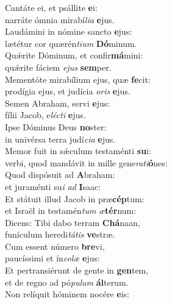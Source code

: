 \evenverse Cantáte ei, et psállite \textbf{e}i:~\*\\
\evenverse narráte ómnia mirabí\textit{li}\textit{a} \textbf{e}jus.\\
\oddverse Laudámini in nómine sancto \textbf{e}jus:~\*\\
\oddverse lætétur cor quærén\textit{ti}\textit{um} \textbf{Dó}minum.\\
\evenverse Quǽrite Dóminum, et confir\textbf{má}mini:~\*\\
\evenverse quǽrite fáciem \textit{e}\textit{jus} \textbf{sem}per.\\
\oddverse Mementóte mirabílium ejus, quæ \textbf{fe}cit:~\*\\
\oddverse prodígia ejus, et judícia \textit{o}\textit{ris} \textbf{e}jus.\\
\evenverse Semen Abraham, servi \textbf{e}jus:~\*\\
\evenverse fílii Jacob, e\textit{lé}\textit{cti} \textbf{e}jus.\\
\oddverse Ipse Dóminus Deus \textbf{no}ster:~\*\\
\oddverse in univérsa terra judí\textit{ci}\textit{a} \textbf{e}jus.\\
\evenverse Memor fuit in sǽculum testaménti \textbf{su}i:~\*\\
\evenverse verbi, quod mandávit in mille gene\textit{ra}\textit{ti}\textbf{ó}nes:\\
\oddverse Quod dispósuit ad \textbf{A}braham:~\*\\
\oddverse et juraménti su\textit{i} \textit{ad} \textbf{I}saac:\\
\evenverse Et státuit illud Jacob in præ\textbf{cép}tum:~\*\\
\evenverse et Israël in testamén\textit{tum} \textit{æ}\textbf{tér}num:\\
\oddverse Dicens: Tibi dabo terram \textbf{Chá}naan,~\*\\
\oddverse funículum heredi\textit{tá}\textit{tis} \textbf{ve}stræ.\\
\evenverse Cum essent número \textbf{bre}vi,~\*\\
\evenverse paucíssimi et ín\textit{co}\textit{læ} \textbf{e}jus:\\
\oddverse Et pertransiérunt de gente in \textbf{gen}tem,~\*\\
\oddverse et de regno ad pó\textit{pu}\textit{lum} \textbf{ál}terum.\\
\evenverse Non relíquit hóminem nocére \textbf{e}is:~\*\\
